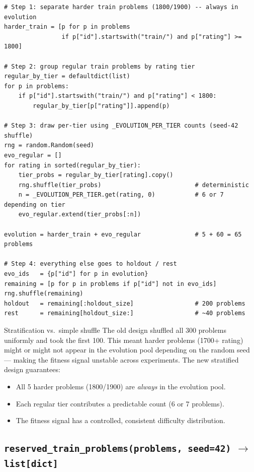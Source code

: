 \documentclass[11pt,a4paper]{report}
\newcommand{\fn}[1]{\texttt{#1}}
\begin{document}
\begin{lstlisting}[style=example]
# Step 1: separate harder train problems (1800/1900) -- always in evolution
harder_train = [p for p in problems
                if p["id"].startswith("train/") and p["rating"] >= 1800]

# Step 2: group regular train problems by rating tier
regular_by_tier = defaultdict(list)
for p in problems:
    if p["id"].startswith("train/") and p["rating"] < 1800:
        regular_by_tier[p["rating"]].append(p)

# Step 3: draw per-tier using _EVOLUTION_PER_TIER counts (seed-42 shuffle)
rng = random.Random(seed)
evo_regular = []
for rating in sorted(regular_by_tier):
    tier_probs = regular_by_tier[rating].copy()
    rng.shuffle(tier_probs)                          # deterministic
    n = _EVOLUTION_PER_TIER.get(rating, 0)           # 6 or 7 depending on tier
    evo_regular.extend(tier_probs[:n])

evolution = harder_train + evo_regular               # 5 + 60 = 65 problems

# Step 4: everything else goes to holdout / rest
evo_ids   = {p["id"] for p in evolution}
remaining = [p for p in problems if p["id"] not in evo_ids]
rng.shuffle(remaining)
holdout   = remaining[:holdout_size]                 # 200 problems
rest      = remaining[holdout_size:]                 # ~40 problems
\end{lstlisting}

\begin{conceptbox}{Stratification vs.\ simple shuffle}
The old design shuffled all 300 problems uniformly and took the first 100.  This meant
harder problems (1700+ rating) might or might not appear in the evolution pool depending
on the random seed --- making the fitness signal unstable across experiments.  The new
stratified design guarantees:
\begin{itemize}[nosep]
  \item All 5 harder problems (1800/1900) are \emph{always} in the evolution pool.
  \item Each regular tier contributes a predictable count (6 or 7 problems).
  \item The fitness signal has a controlled, consistent difficulty distribution.
\end{itemize}
\end{conceptbox}

\subsection{\fn{reserved\_train\_problems(problems, seed=42)} $\to$ \fn{list[dict]}}
\end{document}
